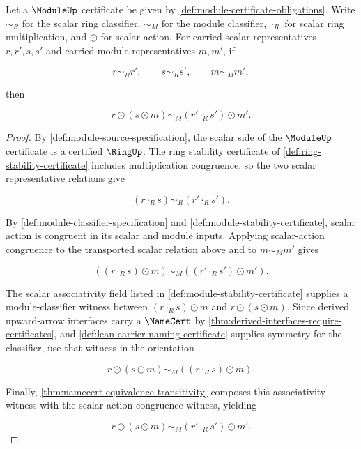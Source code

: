 \begin{theorem}
\label{thm:module-scalar-representative-transport-compatibility}
Let a $\ModuleUp$ certificate be given by \autoref{def:module-certificate-obligations}. Write $\sim_R$ for the scalar ring classifier, $\sim_M$ for the module classifier, $\cdot_R$ for scalar ring multiplication, and $\odot$ for scalar action. For carried scalar representatives $r,r',s,s'$ and carried module representatives $m,m'$, if

$$
r\sim_R r',\qquad s\sim_R s',\qquad m\sim_M m',
$$

then

$$
r\odot(s\odot m)\sim_M (r'\cdot_R s')\odot m'.
$$

\end{theorem}
\begin{proof}
By \autoref{def:module-source-specification}, the scalar side of the $\ModuleUp$ certificate is a certified $\RingUp$. The ring stability certificate of \autoref{def:ring-stability-certificate} includes multiplication congruence, so the two scalar representative relations give

$$
(r\cdot_R s)\sim_R(r'\cdot_R s').
$$

By \autoref{def:module-classifier-specification} and \autoref{def:module-stability-certificate}, scalar action is congruent in its scalar and module inputs. Applying scalar-action congruence to the transported scalar relation above and to $m\sim_M m'$ gives

$$
((r\cdot_R s)\odot m)\sim_M((r'\cdot_R s')\odot m').
$$

The scalar associativity field listed in \autoref{def:module-stability-certificate} supplies a module-classifier witness between $(r\cdot_R s)\odot m$ and $r\odot(s\odot m)$. Since derived upward-arrow interfaces carry a $\NameCert$ by \autoref{thm:derived-interfaces-require-certificates}, and \autoref{def:lean-carrier-naming-certificate} supplies symmetry for the classifier, use that witness in the orientation

$$
r\odot(s\odot m)\sim_M((r\cdot_R s)\odot m).
$$

Finally, \autoref{thm:namecert-equivalence-transitivity} composes this associativity witness with the scalar-action congruence witness, yielding

$$
r\odot(s\odot m)\sim_M (r'\cdot_R s')\odot m'.
$$

\end{proof}

